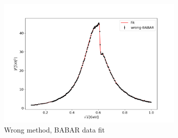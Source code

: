 \documentclass[a4paper]{article}
\begin{document}
\begin{figure}[H]
    \centering
    \includegraphics[width=0.8\textwidth]{./plots/wrong-BABAR.png}
    \caption{Wrong method, BABAR data fit\label{fig4}}
\end{figure}

\printbibliography
\end{document}
